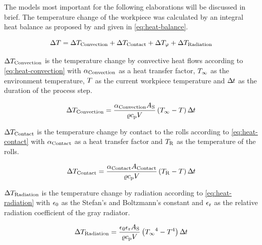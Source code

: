 The models most important for the following elaborations will be discussed in brief.
The temperature change of the workpiece was calculated by an integral heat balance as proposed by \textcite{Hensel1990} and given in \autoref{eq:heat-balance}.

\begin{equation}
    \Delta{T} = {\Delta{T}_\mathrm{Convection}} + {\Delta{T}_\mathrm{Contact}} + \Delta{T}_{{\varphi}} + {\Delta{T}_\mathrm{Radiation}}
    \label{eq:heat-balance}
\end{equation}

\noindent${\Delta{T}_\mathrm{Convection}}$ is the temperature change by convective heat flows according to \autoref{eq:heat-convection} with ${{\alpha}_\mathrm{Convection}}$ as a heat transfer factor, ${{T}_\infty}$ as the environment temperature, ${T}$ as the current workpiece temperature and ${\Delta\mspace{-1mu}t}$ as the duration of the process step.

\begin{equation}
    {\Delta{T}_\mathrm{Convection}} = \frac{{{\alpha}_\mathrm{Convection}} {{A}_\mathrm{S}}}{{\varrho}{c_\mathrm{p}}{V}} \left( {{T}_\infty} - {T} \right) {\Delta\mspace{-1mu}t}
    \label{eq:heat-convection}
\end{equation}

\noindent${\Delta{T}_\mathrm{Contact}}$ is the temperature change by contact to the rolls according to \autoref{eq:heat-contact} with ${{\alpha}_\mathrm{Contact}}$ as a heat transfer factor and ${{T}_\mathrm{R}}$ as the temperature of the rolls.

\begin{equation}
    {\Delta{T}_\mathrm{Contact}} = \frac{{{\alpha}_\mathrm{Contact}} {{A}_\mathrm{Contact}}}{{\varrho}{c_\mathrm{p}}{V}} \left( {{T}_\mathrm{R}} - {T} \right) {\Delta\mspace{-1mu}t}
    \label{eq:heat-contact}
\end{equation}

\noindent${\Delta{T}_\mathrm{Radiation}}$ is the temperature change by radiation according to \autoref{eq:heat-radiation} with ${\epsilon_0}$ as the Stefan's and Boltzmann's constant and ${\epsilon_\mathrm{r}}$ as the relative radiation coefficient of the gray radiator.

\begin{equation}
    {\Delta{T}_\mathrm{Radiation}} = \frac{{\epsilon_0} {\epsilon_\mathrm{r}} {{A}_\mathrm{S}}}{{\varrho}{c_\mathrm{p}}{V}} \left( {{T}_\infty}^4 - {T}^4 \right) {\Delta\mspace{-1mu}t}
    \label{eq:heat-radiation}
\end{equation}

